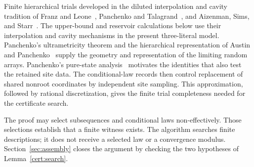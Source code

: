 Finite hierarchical trials developed in the diluted interpolation and
cavity tradition of Franz and Leone~\cite{FranzLeone2003}, Panchenko
and Talagrand~\cite{PanchenkoTalagrand2004}, and Aizenman, Sims, and
Starr~\cite{AizenmanSimsStarr2003}. The upper-bound and reservoir
calculations below use their interpolation and cavity mechanisms in the
present three-literal model. Panchenko's ultrametricity theorem and the
hierarchical representation of Austin and
Panchenko~\cite{Panchenko2013UM,AustinPanchenko2014} supply the geometry
and representation of the limiting random arrays. Panchenko's pure-state
analysis~\cite{Panchenko2015HE} motivates the identities that also test
the retained site data. The conditional-law records then control
replacement of shared nonroot coordinates by independent site sampling.
This approximation, followed by rational discretization, gives the finite
trial completeness needed for the certificate search.

The proof may select subsequences and conditional laws non-effectively.
Those selections establish that a finite witness exists. The algorithm
searches finite descriptions; it does not receive a selected law or a
convergence modulus. Section~\ref{sec:assembly} closes the argument by
checking the two hypotheses of Lemma~\ref{cert:search}.
